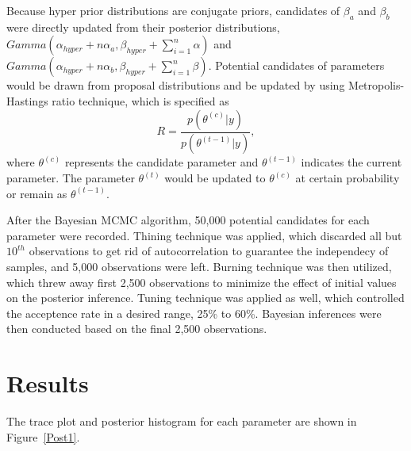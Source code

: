 \documentclass[11pt]{article}\usepackage[]{graphicx}\usepackage[]{color}
\begin{document}
{Because hyper prior distributions are conjugate priors, candidates of $\beta_a$ and $\beta_b$ were directly updated from their posterior distributions, $Gamma(\alpha_{hyper}+n\alpha_a, \beta_{hyper}+\textstyle \sum _{i=1}^n \alpha )$ and $Gamma(\alpha_{hyper}+n\alpha_b, \beta_{hyper}+\textstyle \sum _{i=1}^n \beta )$. Potential candidates of parameters would be drawn from proposal distributions and be updated by using Metropolis-Hastings ratio technique, which is specified as
\begin{equation}
R = \frac{p(\theta^{(c)}|y)}{p(\theta^{(t-1)}|y)},
\end{equation}
where $\theta^{(c)}$ represents the candidate parameter and $\theta^{(t-1)}$ indicates the current parameter. The parameter $\theta^{(t)}$ would be updated to $\theta^{(c)}$ at certain probability or remain as $\theta^{(t-1)}$.

After the Bayesian MCMC algorithm, 50,000 potential candidates for each parameter were recorded. Thining technique was applied, which discarded all but $10^{th}$ observations to get rid of autocorrelation to guarantee the independecy of samples, and 5,000 observations were left. Burning technique was then utilized, which threw away first 2,500 observations to minimize the effect of initial values on the posterior inference.
Tuning technique was applied as well, which controlled the acceptence rate in a desired range, 25\% to 60\%. Bayesian inferences were then conducted based on the final 2,500 observations.  







\section{Results}

The trace plot and posterior histogram for each parameter are shown in Figure~\ref{Post1}. 

}
\end{document}
